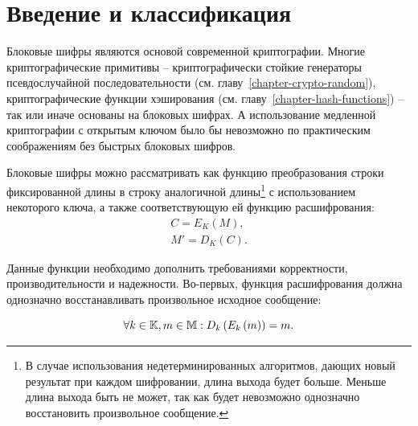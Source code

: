 \section{Введение и классификация}\label{section-block-ciphers-intro}

Блоковые шифры являются основой современной криптографии. Многие криптографические примитивы -- криптографически стойкие генераторы псевдослучайной последовательности (см. главу~\ref{chapter-crypto-random}), криптографические функции хэширования (см. главу~\ref{chapter-hash-functions}) -- так или иначе основаны на блоковых шифрах. А использование медленной криптографии с открытым ключом было бы невозможно по практическим соображениям без быстрых блоковых шифров.

Блоковые шифры можно рассматривать как функцию преобразования строки фиксированной длины в строку аналогичной длины\footnote{В случае использования недетерминированных алгоритмов, дающих новый результат при каждом шифровании, длина выхода будет больше. Меньше длина выхода быть не может, так как будет невозможно однозначно восстановить произвольное сообщение.} с использованием некоторого ключа, а также соответствующую ей функцию расшифрования:
\[\begin{array}{l}
	C = E_K\left( M \right), \\
	M'= D_K\left( C \right).
\end{array}\]

Данные функции необходимо дополнить требованиями корректности, производительности и надежности. Во-первых, функция расшифрования должна однозначно восстанавливать произвольное исходное сообщение:

\[ \forall k \in \mathbb{K}, m \in \mathbb{M}: D_k \left( E_k\left( m \right) \right) = m. \]


